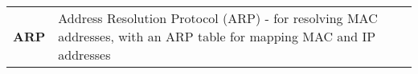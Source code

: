 
\def\arraystretch{1.5}
\begin{table}[H]
    \centering
    \begin{tabular}{ p{4cm}  p{12cm} } 
        \textbf{ARP} & Address Resolution Protocol (ARP) - for resolving MAC addresses, with an ARP table for mapping MAC and IP addresses \\ 
    \end{tabular}
\end{table}